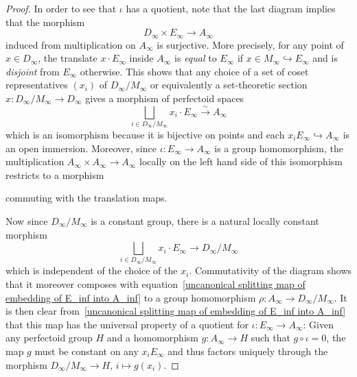 \documentclass[10pt,oneside]{amsart}
\theoremstyle{definition}
\theoremstyle{remark}
\begin{document}
\begin{proof}
	In order to see that $\iota$ has a quotient, note that the last diagram implies that the morphism
	\[D_\infty\times E_\infty \rightarrow A_\infty\]
	induced from multiplication on $A_\infty$ is surjective. More precisely, for any point of $x\in D_\infty$, the translate $x\cdot E_\infty$ inside $A_\infty$ is \textit{equal} to $E_\infty$ if $x\in M_\infty \hookrightarrow E_\infty$ and is \textit{disjoint} from $E_\infty$ otherwise. This shows that any choice of a set of coset representatives $(x_i)$ of $D_\infty/M_\infty$ or equivalently a set-theoretic section  $x:D_\infty/M_\infty\rightarrow D_\infty$ gives a morphism of perfectoid spaces
	\begin{equation}\label{uncanonical splitting map of embedding of E_inf into A_inf}
	\bigsqcup_{i\in D_\infty/M_\infty} x_i\cdot E_\infty\xrightarrow{\sim} A_\infty
	\end{equation}
	which is an isomorphism because it is bijective on points and each $x_iE_\infty \hookrightarrow A_\infty$ is an open immersion. Moreover, since $\iota:E_\infty\rightarrow A_\infty$ is a group homomorphism, the multiplication $A_\infty\times A_\infty \rightarrow A_\infty$ locally on the left hand side of this isomorphism restricts to a morphism
	\begin{center}
	\end{center}
	commuting with the translation maps.
	
	Now since $D_\infty/M_\infty$ is a constant group, there is a natural locally constant morphism
	\[\bigsqcup_{i\in D_\infty/M_\infty} x_i\cdot E_\infty \rightarrow D_\infty/M_\infty\]
	which is independent of the choice of the $x_i$.
	Commutativity of the diagram shows that it moreover composes with equation~\ref{uncanonical splitting map of embedding of E_inf into A_inf} to a group homomorphism $\rho:A_\infty \rightarrow D_\infty/M_\infty$. It is then clear from~\ref{uncanonical splitting map of embedding of E_inf into A_inf} that this map has the universal property of a quotient for $\iota:E_\infty \rightarrow A_\infty$: Given any perfectoid group $H$ and a homomorphism $g:A_\infty\rightarrow H$ such that $g\circ\iota = 0$, the map $g$ must be constant on any $x_iE_\infty$ and thus factors uniquely through the morphism $D_\infty/M_\infty \rightarrow H$, $i\mapsto g(x_i)$.
	

\end{proof}
\end{document}
